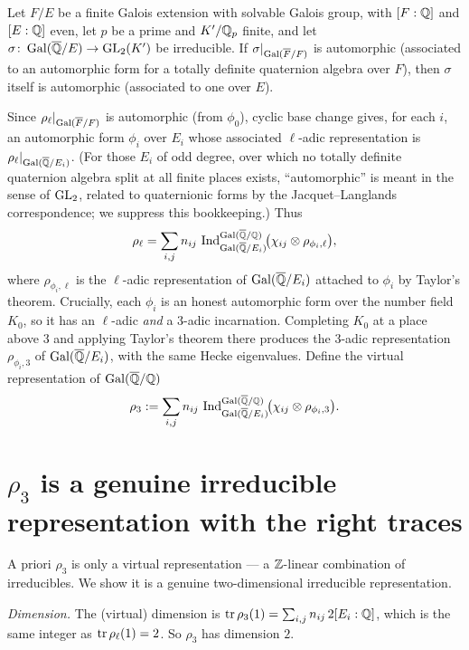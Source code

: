 \documentclass[11pt]{article}
\begin{document}
\begin{theorem}\label{thm:bc}
Let $F/E$ be a finite Galois extension with solvable Galois group, with
$[F:\mathbb{Q}]$ and $[E:\mathbb{Q}]$ even, let $p$ be a prime and $K'/\mathbb{Q}_p$ finite, and let
$\sigma\colon\operatorname{Gal}(\overline{\mathbb{Q}}/E)\to\operatorname{GL}_2(K')$ be irreducible. If $\sigma|_{\operatorname{Gal}(\overline{F}/F)}$ is
automorphic (associated to an automorphic form for a totally definite
quaternion algebra over $F$), then $\sigma$ itself is automorphic (associated to
one over $E$).
\end{theorem}

Since $\rho_\ell|_{\operatorname{Gal}(\overline{F}/F)}$ is automorphic (from $\phi_0$), cyclic base change gives,
for each $i$, an automorphic form $\phi_i$ over $E_i$ whose associated $\ell$-adic
representation is $\rho_\ell|_{\operatorname{Gal}(\overline{\mathbb{Q}}/E_i)}$. (For those $E_i$ of odd degree,
over which no totally definite quaternion algebra split at all finite places
exists, ``automorphic'' is meant in the sense of $\operatorname{GL}_2$, related to
quaternionic forms by the Jacquet--Langlands correspondence; we suppress this
bookkeeping.) Thus
\[
  \rho_\ell=\sum_{i,j} n_{ij}\,
   \operatorname{Ind}_{\operatorname{Gal}(\overline{\mathbb{Q}}/E_i)}^{\operatorname{Gal}(\overline{\mathbb{Q}}/\mathbb{Q})}\!\bigl(\chi_{ij}\otimes\rho_{\phi_i,\ell}\bigr),
\]
where $\rho_{\phi_i,\ell}$ is the $\ell$-adic representation of $\operatorname{Gal}(\overline{\mathbb{Q}}/E_i)$
attached to $\phi_i$ by Taylor's theorem. Crucially, each $\phi_i$ is an
honest automorphic form over the number field $K_0$, so it has an $\ell$-adic
\emph{and} a $3$-adic incarnation. Completing $K_0$ at a place above $3$ and
applying Taylor's theorem there produces the $3$-adic representation
$\rho_{\phi_i,3}$ of $\operatorname{Gal}(\overline{\mathbb{Q}}/E_i)$, with the same Hecke eigenvalues. Define
the virtual representation of $\operatorname{Gal}(\overline{\mathbb{Q}}/\mathbb{Q})$
\[
  \rho_3:=\sum_{i,j} n_{ij}\,
   \operatorname{Ind}_{\operatorname{Gal}(\overline{\mathbb{Q}}/E_i)}^{\operatorname{Gal}(\overline{\mathbb{Q}}/\mathbb{Q})}\!\bigl(\chi_{ij}\otimes\rho_{\phi_i,3}\bigr).
\]

\section{$\rho_3$ is a genuine irreducible representation with the right traces}

A priori $\rho_3$ is only a virtual representation --- a $\mathbb{Z}$-linear combination
of irreducibles. We show it is a genuine two-dimensional irreducible
representation.

\emph{Dimension.} The (virtual) dimension is $\operatorname{tr}\rho_3(1)=\sum_{i,j}n_{ij}\,
2[E_i:\mathbb{Q}]$, which is the same integer as $\operatorname{tr}\rho_\ell(1)=2$. So $\rho_3$ has
dimension $2$.
\end{document}
